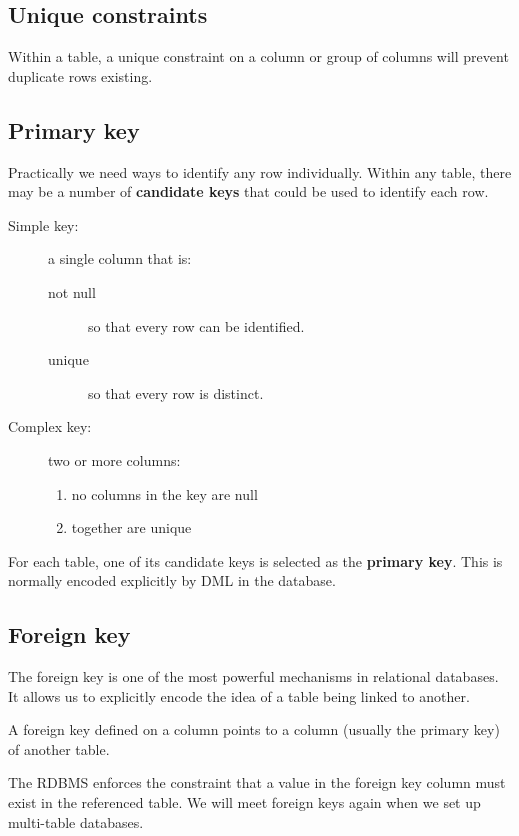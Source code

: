 \subsection{Unique constraints}

Within a table, a unique constraint on a column or group of columns will prevent duplicate rows existing.  

\subsection{Primary key}

Practically we need ways to identify any row individually.
Within any table, there may be a number of \textbf{candidate keys} that could be used to identify each row.
\begin{description}
\item[Simple key:] a single column that is:
  \begin{description}
  \item[not null] so that every row can be identified.
  \item[unique] so that every row is distinct. 
  \end{description}
\item[Complex key:] two or more columns:
  \begin{enumerate}
  \item no columns in the key are null
  \item together are unique
  \end{enumerate}
\end{description}
For each table, one of its candidate keys is selected as the \textbf{primary key}.
This is normally encoded explicitly by DML in the database.


\subsection{Foreign key}

The foreign key is one of the most powerful mechanisms in relational databases.
It allows us to explicitly encode the idea of a table being linked to another.

A foreign key defined on a column points to a column (usually the primary key) of another table.

The RDBMS enforces the constraint that a value in the foreign key column must exist in the referenced table.
We will meet foreign keys again when we set up multi-table databases.



